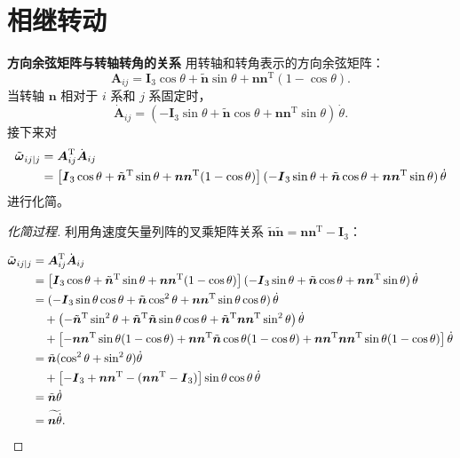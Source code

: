 \section{相继转动}
\textbf{方向余弦矩阵与转轴转角的关系} 用转轴和转角表示的方向余弦矩阵：
\[
\boldsymbol{A}_{ij}=\boldsymbol{I}_3\cos\theta+\tilde{\boldsymbol{n}}\sin\theta+\boldsymbol{n}\boldsymbol{n}^{\mathrm{T}}(1-\cos\theta).
\]
当转轴 $\boldsymbol{n}$ 相对于 $i$ 系和 $j$ 系固定时，
\[
\dot{\boldsymbol{A}}_{ij}=(-\boldsymbol{I}_3\sin\theta+\tilde{\boldsymbol{n}}\cos\theta+\boldsymbol{n}\boldsymbol{n}^{\mathrm{T}}\sin\theta)\,\dot{\theta}.
\]
接下来对
\begin{align*}
\tilde{\boldsymbol{\omega}}_{ij|j} &= \boldsymbol{A}_{ij}^{\mathrm{T}}\dot{\boldsymbol{A}}_{ij}\notag\\
&= \left[\boldsymbol{I}_3\cos\theta+\tilde{\boldsymbol{n}}^{\mathrm{T}}\sin\theta+\boldsymbol{n}\boldsymbol{n}^{\mathrm{T}}(1-\cos\theta)\right](-\boldsymbol{I}_3\sin\theta+\tilde{\boldsymbol{n}}\cos\theta+\boldsymbol{n}\boldsymbol{n}^{\mathrm{T}}\sin\theta)\,\dot{\theta}
\end{align*}
进行化简。
\begin{proof}[化简过程]
利用角速度矢量列阵的叉乘矩阵关系 $\tilde{\boldsymbol{n}}\tilde{\boldsymbol{n}}=\boldsymbol{n}\boldsymbol{n}^{\mathrm{T}}-\boldsymbol{I}_3$：

\begin{align*}
\tilde{\boldsymbol{\omega}}_{ij|j} &= \boldsymbol{A}_{ij}^{\mathrm{T}}\dot{\boldsymbol{A}}_{ij}\notag\\
&= \left[\boldsymbol{I}_3\cos\theta+\tilde{\boldsymbol{n}}^{\mathrm{T}}\sin\theta+\boldsymbol{n}\boldsymbol{n}^{\mathrm{T}}(1-\cos\theta)\right](-\boldsymbol{I}_3\sin\theta+\tilde{\boldsymbol{n}}\cos\theta+\boldsymbol{n}\boldsymbol{n}^{\mathrm{T}}\sin\theta)\,\dot{\theta}\notag\\
&= (-\boldsymbol{I}_3\sin\theta\cos\theta+\tilde{\boldsymbol{n}}\cos^2\theta+\boldsymbol{n}\boldsymbol{n}^{\mathrm{T}}\sin\theta\cos\theta)\,\dot{\theta}\notag\\
&\quad + \left(-\tilde{\boldsymbol{n}}^{\mathrm{T}}\sin^2\theta+\tilde{\boldsymbol{n}}^{\mathrm{T}}\tilde{\boldsymbol{n}}\sin\theta\cos\theta+\tilde{\boldsymbol{n}}^{\mathrm{T}}\boldsymbol{n}\boldsymbol{n}^{\mathrm{T}}\sin^2\theta\right)\dot{\theta}\notag\\
&\quad + \left[-\boldsymbol{n}\boldsymbol{n}^{\mathrm{T}}\sin\theta(1-\cos\theta)+\boldsymbol{n}\boldsymbol{n}^{\mathrm{T}}\tilde{\boldsymbol{n}}\cos\theta(1-\cos\theta)+\boldsymbol{n}\boldsymbol{n}^{\mathrm{T}}\boldsymbol{n}\boldsymbol{n}^{\mathrm{T}}\sin\theta(1-\cos\theta)\right]\dot{\theta}\notag\\
&= \tilde{\boldsymbol{n}}(\cos^2\theta+\sin^2\theta)\dot{\theta}\notag\\
&\quad + \left[-\boldsymbol{I}_3+\boldsymbol{n}\boldsymbol{n}^{\mathrm{T}}-(\boldsymbol{n}\boldsymbol{n}^{\mathrm{T}}-\boldsymbol{I}_3)\right]\sin\theta\cos\theta\,\dot{\theta}\notag\\
&= \tilde{\boldsymbol{n}}\dot{\theta}\notag\\
&= \widetilde{\boldsymbol{n}\dot{\theta}}.
\end{align*}
\end{proof}
